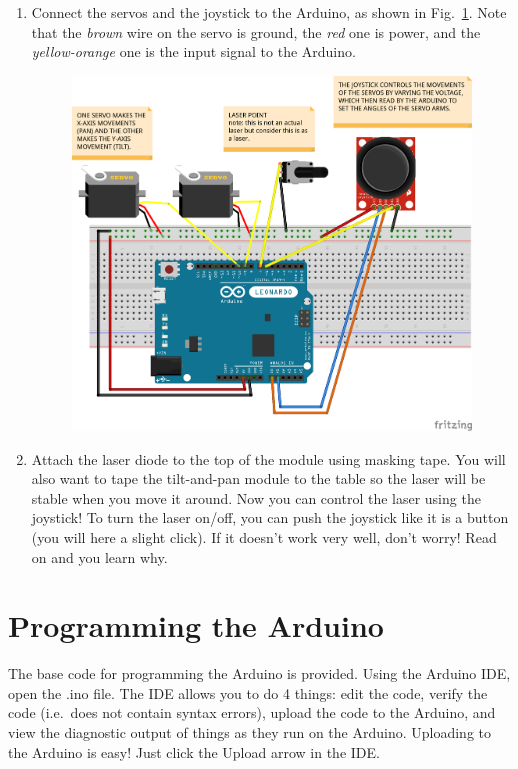 \documentclass{article}
\begin{document}
\begin{enumerate}
\item {Connect the servos and the joystick to the Arduino, as shown in
    Fig.~\ref{fig:diagram}. Note that the \emph{brown} wire on the servo is ground,
    the \emph{red} one is power, and the \emph{yellow-orange} one is the input signal
    to the Arduino.

    \begin{figure}[H]
      \centering
      \includegraphics[width=\textwidth]{figures/diagram.png}
      \caption{\label{fig:diagram}}
    \end{figure}
  }
\item {Attach the laser diode to the top of the module using masking tape. You will
    also want to tape the tilt-and-pan module to the table so the laser will be
    stable when you move it around. Now you can control the laser using the joystick!
    To turn the laser on/off, you can push the joystick like it is a button (you will
    here a slight click). If it doesn't work very well, don't worry! Read on and you
    learn why.}
\end{enumerate}
  
\section{Programming the Arduino}
The base code for programming the Arduino is provided. Using the Arduino IDE, open
the .ino file.  The IDE allows you to do 4 things: edit the code, verify the code
(i.e.~does not contain syntax errors), upload the code to the Arduino, and view the
diagnostic output of things as they run on the Arduino.  Uploading to the Arduino is
easy! Just click the Upload arrow in the IDE.
\end{document}
